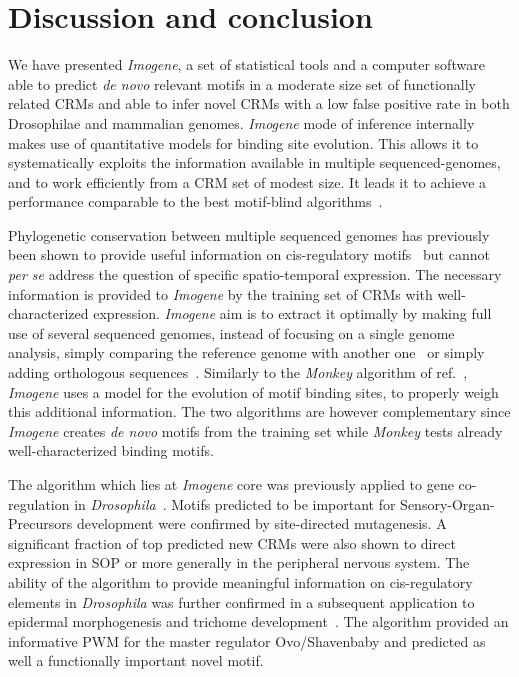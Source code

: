 \documentclass[a4,center,fleqn]{NAR}
\begin{document}
\section{Discussion and conclusion}

We have presented \textit{Imogene}, a set of statistical tools  and a computer
software able to predict {\em de novo} relevant motifs in a moderate size set
of functionally related CRMs and able to infer novel CRMs with a low false
positive rate in both Drosophilae and mammalian genomes.
\textit{Imogene} mode of inference internally makes use of quantitative
models for binding site evolution.
This allows it to  systematically exploits the information available in
multiple sequenced-genomes, and to work efficiently from a CRM set of modest
size.
It leads it to achieve a performance comparable to the best motif-blind
algorithms~\cite{kantorovitz2009motif}.  

Phylogenetic conservation between multiple sequenced genomes has previously
been shown to provide useful information on cis-regulatory
motifs~\cite{xie2005systematic, ettwiller2005discovery, stark2007discovery} but
cannot {\em per se} address the question of specific spatio-temporal
expression.
The necessary information is provided to {\em Imogene} by the training set of
CRMs with well-characterized expression.
{\em Imogene} aim is to extract it optimally by making full use of several
sequenced genomes, instead of focusing on a single genome~\cite{Herrmann2012uq}
analysis, simply comparing the reference genome with another
one~\cite{wang2003combining, grad2004prediction, zhao2007identification} or
simply adding orthologous sequences~\cite{Busser:2012uq}.
Similarly 
to the {\em Monkey} algorithm of ref.~\cite{Moses:2004vn}, {\em Imogene} uses
a model for the evolution of motif binding sites, to properly weigh this
additional information. 
The two algorithms are however complementary since {\em Imogene} creates {\em
de novo} motifs from the training set while {\em Monkey} tests  already
well-characterized binding motifs.

The algorithm which lies at \textit{Imogene} core was previously applied to
gene co-regulation in {\em Drosophila}~\cite{Rouault:2010fk}.
Motifs predicted to be important for Sensory-Organ-Precursors development were
confirmed by site-directed mutagenesis.
A significant fraction of top predicted new CRMs were also shown to direct
expression in SOP or more generally in the peripheral nervous system.
The ability of the algorithm  to provide meaningful information on
cis-regulatory elements in {\em Drosophila} was further confirmed in
a subsequent application to epidermal morphogenesis and trichome
development~\cite{Menoret2012}.
The algorithm provided an informative PWM for the master regulator
Ovo/Shavenbaby and predicted as well a functionally important novel motif. 
\end{document}
